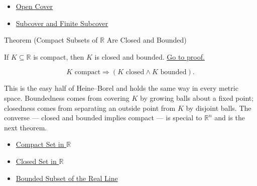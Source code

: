 \begin{dependencies}
\begin{itemize}
  \item \hyperref[def:real-open-cover]{Open Cover}
  \item \hyperref[def:finite-subcover]{Subcover and Finite Subcover}
\end{itemize}
\end{dependencies}
\begin{theorembox}{Theorem (Compact Subsets of $\mathbb{R}$ Are Closed and Bounded)}
\begin{theorem}
\label{thm:compact-implies-closed-bounded}
If $K\subseteq\mathbb{R}$ is compact, then $K$ is closed and bounded.
\hyperref[prf:compact-implies-closed-bounded]{Go to proof.}
\end{theorem}
\end{theorembox}
\begin{remark*}
\[
K \text{ compact} \Longrightarrow (K \text{ closed} \land K \text{ bounded}).
\]
\end{remark*}
\begin{remark*}[Interpretation]
This is the easy half of Heine--Borel and holds the same way in every metric space. Boundedness comes from covering $K$ by growing balls about a fixed point; closedness comes from separating an outside point from $K$ by disjoint balls. The converse --- closed and bounded implies compact --- is special to $\mathbb{R}^{n}$ and is the next theorem.
\end{remark*}
\begin{dependencies}
\begin{itemize}
  \item \hyperref[def:compact-set]{Compact Set in $\mathbb{R}$}
  \item \hyperref[def:closed-set]{Closed Set in $\mathbb{R}$}
  \item \hyperref[def:bounded-subset-of-r]{Bounded Subset of the Real Line}
\end{itemize}
\end{dependencies}
